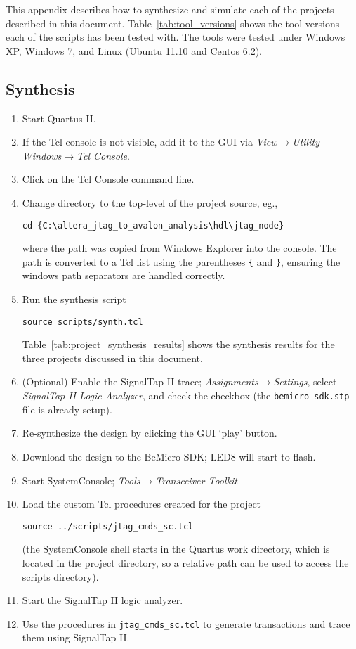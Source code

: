 \documentclass[10pt,twoside]{article}
\begin{document}
This appendix describes how to synthesize and simulate each of
the projects described in this document.
Table~\ref{tab:tool_versions} shows the tool versions each of the
scripts has been tested with. The tools were tested under
Windows XP, Windows 7, and Linux (Ubuntu 11.10 and Centos 6.2).

\subsection{Synthesis}

\begin{enumerate}
\item Start Quartus II.
\item If the Tcl console is not visible, add it to the GUI via
{\em View}$\rightarrow${\em Utility Windows}$\rightarrow${\em Tcl Console}.
\item Click on the Tcl Console command line.
\item Change directory to the top-level of the project source, eg.,
%
\begin{verbatim}
cd {C:\altera_jtag_to_avalon_analysis\hdl\jtag_node}
\end{verbatim}
where the path was copied from Windows Explorer into the console.
The path is converted to a Tcl list using the parentheses \verb+{+ 
and \verb+}+, ensuring the windows path separators are handled correctly.
%
\item Run the synthesis script
%
\begin{verbatim}
source scripts/synth.tcl
\end{verbatim}
%
Table~\ref{tab:project_synthesis_results} shows the synthesis results
for the three projects discussed in this document.
%
\item (Optional) Enable the SignalTap II trace; 
{\em Assignments}$\rightarrow${\em Settings}, select
{\em SignalTap II Logic Analyzer}, and check the checkbox
(the \verb+bemicro_sdk.stp+ file is already setup).
%
\item Re-synthesize the design by clicking the GUI `play' button.
%
\item Download the design to the BeMicro-SDK; LED8 will start to flash.
%
\item Start SystemConsole; {\em Tools}$\rightarrow${\em Transceiver Toolkit}
%
\item Load the custom Tcl procedures created for the project
%
\begin{verbatim}
source ../scripts/jtag_cmds_sc.tcl
\end{verbatim}
%
(the SystemConsole shell starts in the Quartus work directory, which
is located in the project directory, so a relative path can be used to
access the scripts directory).
%
\item Start the SignalTap II logic analyzer.
%
\item Use the procedures in \verb+jtag_cmds_sc.tcl+ to generate transactions
and trace them using SignalTap II.
%
\end{enumerate}
\end{document}
